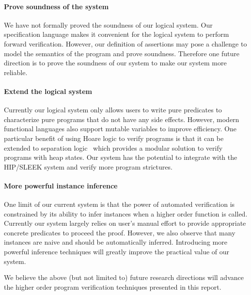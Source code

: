 \paragraph{Prove soundness of the system} We have not formally proved the soundness of our logical system. Our specification language makes it convenient for the logical system to perform forward verification. However, our definition of assertions may pose a challenge to model the semantics of the program and prove soundness. Therefore one future direction is to prove the soundness of our system to make our system more reliable.


\paragraph{Extend the logical system} Currently our logical system only allows users to write pure predicates to characterize pure programs that do not have any side effects. However, modern functional languages also support mutable variables to improve efficiency. One particular benefit of using Hoare logic to verify programs is that it can be extended to separation logic~\cite{Reynolds2002} which provides a modular solution to verify programs with heap states. Our system has the potential to integrate with the HIP/SLEEK system and verify more program strictures.

\paragraph{More powerful instance inference} One limit of our current system is that the power of automated verification is constrained by its ability to infer instances when a higher order function is called. Currently our system largely relies on user's manual effort to provide appropriate concrete predicates to proceed the proof. However, we also observe that many instances are naive and should be automatically inferred. Introducing more powerful inference techniques will greatly improve the practical value of our system.


We believe the above (but not limited to) future research directions will advance the higher order program verification techniques presented in this report.
